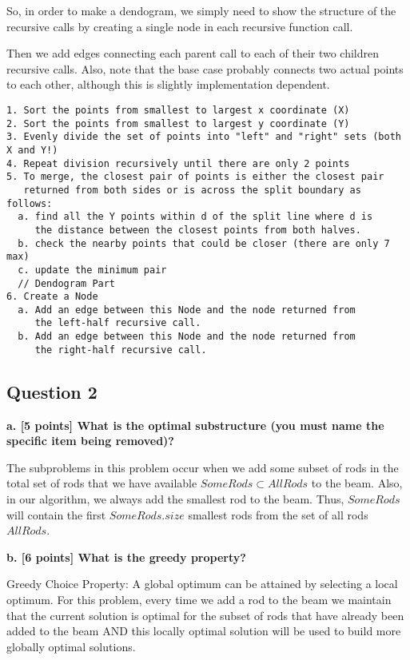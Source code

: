 \documentclass[12pt]{article}
\begin{document}
So, in order to make a dendogram, we simply need to show the structure of the recursive calls by 
creating a single node in each recursive function call. 

Then we add edges connecting each parent call to each of their two children recursive calls. 
Also, note that the base case probably connects two actual points to each other, 
although this is slightly implementation dependent.

\begin{verbatim}
1. Sort the points from smallest to largest x coordinate (X)
2. Sort the points from smallest to largest y coordinate (Y)
3. Evenly divide the set of points into "left" and "right" sets (both X and Y!)
4. Repeat division recursively until there are only 2 points
5. To merge, the closest pair of points is either the closest pair 
   returned from both sides or is across the split boundary as follows:
  a. find all the Y points within d of the split line where d is 
     the distance between the closest points from both halves.
  b. check the nearby points that could be closer (there are only 7 max)
  c. update the minimum pair 
  // Dendogram Part
6. Create a Node 
  a. Add an edge between this Node and the node returned from 
     the left-half recursive call.
  b. Add an edge between this Node and the node returned from 
     the right-half recursive call.
\end{verbatim}

\subsection*{Question 2}
\textbf{a. [5 points] What is the optimal substructure (you must name the specific item being removed)?}

The subproblems in this problem occur when we add some subset of rods in the total set of rods that we have available $SomeRods \subset AllRods$ to the beam. Also, in our algorithm, we always add the smallest rod to the beam. Thus, $SomeRods$ will contain the first $SomeRods.size$ smallest rods from the set of all rods $AllRods$. 

\noindent \textbf{b. [6 points] What is the greedy property? }

Greedy Choice Property: A global optimum can be attained by selecting a local optimum. For this problem, every time we add a rod to the beam we maintain that the current solution is optimal for the subset of rods that have already been added to the beam AND this locally optimal solution will be used to build more globally optimal solutions. 
\end{document}
